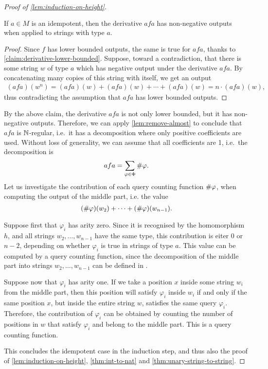\begin{proof}[Proof of \cref{lem:induction-on-height}]
\begin{claim}
    If $a\in M$ is an idempotent, then the derivative $afa$ has non-negative outputs when applied to strings with type $a$. 
\end{claim}
\begin{proof}
    Since $f$ has lower bounded outputs, the same is true for $afa$, thanks to \cref{claim:derivative-lower-bounded}.
    Suppose, toward a contradiction, that there is some string $w$ of type $a$ which has negative output under the derivative $afa$. By concatenating many copies of this string with itself, we get an output 
    \begin{align*}
    (afa)(w^n) = (afa)(w) + (afa)(w) + \cdots + (afa)(w) = n \cdot (afa)(w),
    \end{align*}
    thus contradicting the assumption that $afa$ has lower bounded outputs.
\end{proof}

By the above claim, the derivative $afa$ is not only lower bounded, but it has non-negative outputs. Therefore, we can apply \cref{lem:remove-almost} to conclude that $afa$ is ${\mathbb N}$-regular, i.e.~it has a decomposition where only positive coefficients are used. Without loss of generality, we can assume that all coefficients are 1, i.e.~the decomposition is 
\begin{align*}
afa = \sum_{\varphi \in \Phi} \#{\varphi}.
\end{align*}
Let us investigate the contribution of each query counting function $\#{\varphi}$, when computing the output of the middle part, i.e. the value 
\begin{align*}
    (\#{\varphi})(w_2) +  \cdots + (\#{\varphi})(w_{n-1}).
\end{align*}

Suppose first that $\varphi_i$ has arity zero. Since it is recognised by the homomorphism $h$, and all strings $w_2,\ldots,w_{n-1}$ have the same type, this contribution is eiter $0$ or $n-2$, depending on whether $\varphi_i$ is true in strings of type $a$. This value can be computed by a query counting function, since the decomposition of the middle part into strings $w_2,\ldots,w_{n-1}$ can be defined in \mso. 

Suppose now that $\varphi_i$ has arity one. If we take a position $x$ inside some string $w_i$ from the middle part, then this position will satisfy $\varphi_i$ inside $w_i$ if and only if the same position $x$, but inside the entire string $w$, satisfies the same query $\varphi_i$. Therefore, the contribution of $\varphi_i$ can be obtained by counting the number of positions in $w$ that satisfy $\varphi_i$ and belong to the middle part. This is a query counting function. 

This concludes the idempotent case in the induction step, and thus also the proof of \cref{lem:induction-on-height}, \cref{thm:int-to-nat} and \cref{thm:unary-string-to-string}. 
\end{proof}



